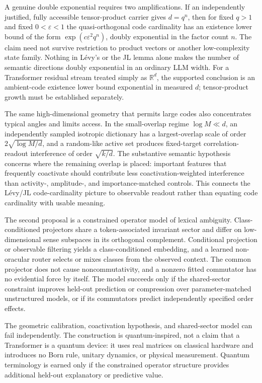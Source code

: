 \documentclass[
  aps,
  reprint,
  superscriptaddress,
  floatfix,
  nofootinbib,
  longbibliography
]{revtex4-2}
\newcommand{\R}{\mathbb{R}}
\newcommand{\Msem}{M}
\begin{document}
A genuine double exponential requires two amplifications.  If an independently
justified, fully accessible tensor-product carrier gives $d=q^n$, then for
fixed $q>1$ and fixed $0<\varepsilon<1$ the quasi-orthogonal code cardinality
has an existence lower bound of the form
$\exp(c\varepsilon^2q^n)$, doubly exponential in the factor count $n$.  The
claim need not survive restriction to product vectors or another
low-complexity state family.  Nothing in L\'evy's or the JL lemma alone makes
the number of semantic directions doubly exponential in an ordinary LLM
width.  For a Transformer
residual stream treated simply as $\R^d$, the supported conclusion is
an ambient-code existence lower bound exponential in measured $d$;
tensor-product growth must be established separately.

The same high-dimensional geometry that permits large codes also concentrates
typical angles and limits access.  In the small-overlap regime
$\log\Msem\ll d$, an independently sampled isotropic dictionary has a
largest-overlap scale of order $2\sqrt{\log\Msem/d}$, and a random-like active set produces fixed-target
correlation-readout interference of order $\sqrt{k/d}$.  The substantive
semantic hypothesis concerns where the remaining overlap is placed: important
features that frequently coactivate should contribute less
coactivation-weighted interference than activity-, amplitude-, and
importance-matched controls.  This connects the L\'evy/JL code-cardinality
picture to
observable readout rather than equating code cardinality with usable meaning.

The second proposal is a constrained operator model of lexical ambiguity.
Class-conditioned projectors share a token-associated invariant sector and differ on
low-dimensional sense subspaces in its orthogonal complement.  Conditional
projection or observable filtering yields a class-conditioned embedding, and a
learned non-oracular router selects or mixes classes from the observed context.
The common projector does not
cause noncommutativity, and a nonzero fitted commutator has no evidential force
by itself.  The model succeeds only if the shared-sector constraint improves
held-out prediction or compression over parameter-matched unstructured models,
or if its commutators predict independently specified order effects.

The geometric calibration, coactivation hypothesis, and shared-sector model
can fail independently.  The construction is quantum-inspired, not a claim
that a Transformer is a quantum device: it uses real matrices on classical
hardware and introduces no Born rule, unitary dynamics, or physical
measurement.  Quantum terminology is earned only if the constrained operator
structure provides additional held-out explanatory or predictive value.
\end{document}
